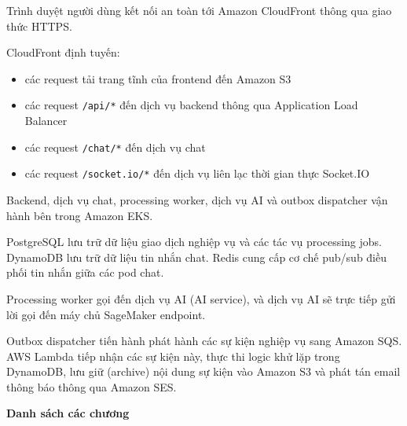 Trình duyệt người dùng kết nối an toàn tới Amazon CloudFront thông qua
giao thức HTTPS.

CloudFront định tuyến:

\begin{itemize}
\tightlist
\item
  các request tải trang tĩnh của frontend đến Amazon S3
\item
  các request \texttt{/\allowbreak{}api/\allowbreak{}*} đến dịch vụ backend thông qua Application
  Load Balancer
\item
  các request \texttt{/\allowbreak{}chat/\allowbreak{}*} đến dịch vụ chat
\item
  các request \texttt{/\allowbreak{}socket.\allowbreak{}io/\allowbreak{}*} đến dịch vụ liên lạc thời gian thực
  Socket.IO
\end{itemize}

Backend, dịch vụ chat, processing worker, dịch vụ AI và outbox
dispatcher vận hành bên trong Amazon EKS.

PostgreSQL lưu trữ dữ liệu giao dịch nghiệp vụ và các tác vụ processing
jobs. DynamoDB lưu trữ dữ liệu tin nhắn chat. Redis cung cấp cơ chế
pub/sub điều phối tin nhắn giữa các pod chat.

Processing worker gọi đến dịch vụ AI (AI service), và dịch vụ AI sẽ trực
tiếp gửi lời gọi đến máy chủ SageMaker endpoint.

Outbox dispatcher tiến hành phát hành các sự kiện nghiệp vụ sang Amazon
SQS. AWS Lambda tiếp nhận các sự kiện này, thực thi logic khử lặp trong
DynamoDB, lưu giữ (archive) nội dung sự kiện vào Amazon S3 và phát tán
email thông báo thông qua Amazon SES.

\vspace{0.5em}\noindent\textbf{Danh sách các
chương}\par


